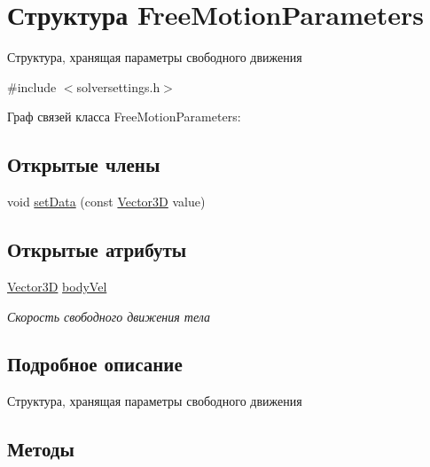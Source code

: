 \hypertarget{struct_free_motion_parameters}{}\section{Структура Free\+Motion\+Parameters}
\label{struct_free_motion_parameters}


Структура, хранящая параметры свободного движения  




{\ttfamily \#include $<$solversettings.\+h$>$}



Граф связей класса Free\+Motion\+Parameters\+:
\subsection*{Открытые члены}
\begin{DoxyCompactItemize}
\item 
void \mbox{\hyperlink{struct_free_motion_parameters_a76895a5f158eb6643cbd5cab678ca50b}{set\+Data}} (const \mbox{\hyperlink{class_vector3_d}{Vector3D}} value)
\end{DoxyCompactItemize}
\subsection*{Открытые атрибуты}
\begin{DoxyCompactItemize}
\item 
\mbox{\label{struct_free_motion_parameters_a11385c12c600faf77846f746a8f2828d}} 
\mbox{\hyperlink{class_vector3_d}{Vector3D}} \mbox{\hyperlink{struct_free_motion_parameters_a11385c12c600faf77846f746a8f2828d}{body\+Vel}}
\begin{DoxyCompactList}\small\item\em Скорость свободного движения тела \end{DoxyCompactList}\end{DoxyCompactItemize}


\subsection{Подробное описание}
Структура, хранящая параметры свободного движения 

\subsection{Методы}
\mbox{\label{struct_free_motion_parameters_a76895a5f158eb6643cbd5cab678ca50b}} 
